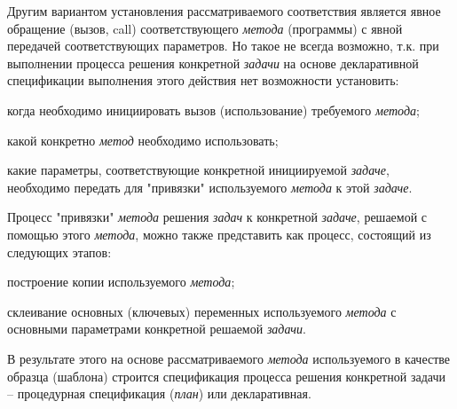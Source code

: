 \begin{SCn}
{Другим вариантом установления рассматриваемого соответствия является явное обращение (вызов, call) соответствующего \textit{метода} (программы) с явной передачей соответствующих параметров. Но такое не всегда возможно, т.к. при выполнении процесса решения конкретной \textit{задачи} на основе декларативной спецификации выполнения этого действия нет возможности установить:
	\begin{scnitemize}
	\item когда необходимо инициировать вызов (использование) требуемого \textit{метода};
	\item какой конкретно \textit{метод} необходимо использовать;
	\item какие параметры, соответствующие конкретной инициируемой \textit{задаче}, необходимо передать для "привязки"{} используемого \textit{метода} к этой \textit{задаче}.
	\end{scnitemize}
	

Процесс "привязки"{} \textit{метода} решения \textit{задач} к конкретной \textit{задаче}, решаемой с помощью этого \textit{метода}, можно также представить как процесс, состоящий из следующих этапов:
	\begin{scnitemize}
	\item построение копии используемого \textit{метода};
	\item склеивание основных (ключевых) переменных используемого \textit{метода} с основными параметрами конкретной решаемой \textit{задачи}.
	\end{scnitemize}

В результате этого на основе рассматриваемого \textit{метода} используемого в качестве образца (шаблона) строится спецификация процесса решения конкретной задачи -- процедурная спецификация (\textit{план}) или декларативная.}



\end{SCn}
